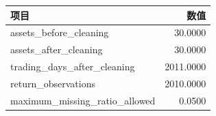 \begin{center}
\small
\begin{tabular}{lr}
\toprule
项目 & 数值 \\
\midrule
assets\_before\_cleaning & 30.0000 \\
assets\_after\_cleaning & 30.0000 \\
trading\_days\_after\_cleaning & 2011.0000 \\
return\_observations & 2010.0000 \\
maximum\_missing\_ratio\_allowed & 0.0500 \\
\bottomrule
\end{tabular}
\end{center}